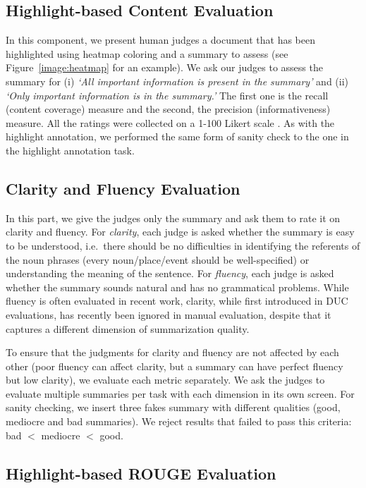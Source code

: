 \documentclass[11pt,a4paper]{article}
\begin{document}
\subsection{Highlight-based Content Evaluation}
In this component, we present human judges a document that has been highlighted using heatmap coloring and a summary to assess (see Figure~\ref{image:heatmap} for an example). We ask our judges to assess the summary for (i) \textit{`All important information is present in the summary'} and (ii) \textit{`Only important information is in the summary.'} The first one is the recall (content coverage) measure and the second, the precision (informativeness) measure. All the ratings were collected on a 1-100 Likert scale \citep{Likert1932}.
As with the highlight annotation, %
we performed the same form of sanity check to the one in the highlight annotation task.


\subsection{Clarity and Fluency Evaluation}
In this part, we give the judges only the summary and ask them to rate it on clarity and fluency. For {\em clarity}, each judge is asked whether the summary is easy to be understood, i.e.\ 
there should be no difficulties in identifying the referents of the noun phrases (every noun/place/event should be well-specified) or understanding the meaning of the sentence. For {\em fluency}, each judge is asked whether the summary sounds natural and has no grammatical problems. %
While fluency is often evaluated in recent work, clarity, while first introduced in DUC evaluations, has recently been ignored in manual evaluation, despite that it captures a different dimension of summarization quality.

To ensure that the judgments for clarity and fluency are not affected by each other (poor fluency can affect clarity, but a summary can have perfect fluency but low clarity), %
we evaluate each metric separately. We ask the judges to evaluate multiple summaries per task with each dimension in its own screen. For sanity checking, we insert three fakes summary with different qualities (good, mediocre and bad summaries). We reject results that failed to pass this criteria: bad $<$ mediocre $<$ good.

\subsection{Highlight-based ROUGE Evaluation} 
\label{subsec:hrouge}
\end{document}
